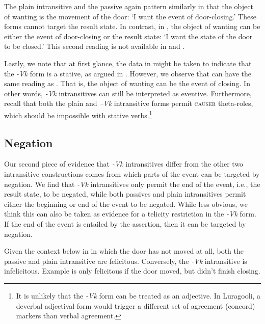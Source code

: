 \documentclass[output=paper]{langsci/langscibook}
\begin{document}
The plain intransitive and the passive again pattern similarly in that the object of wanting is the movement of the door: ‘I want the event of door-closing.’ These forms cannot target the result state. In contrast, in , the object of wanting can be either the event of door-closing or the result state: ‘I want the state of the door to be closed.’ This second reading is not available in  and .

Lastly, we note that at first glance, the data in  might be taken to indicate that the \textit{-Vk} form is a stative, as argued in \citet{Dubinsky1996}. However, we observe that  can have the same reading as . That is, the object of wanting can be the event of closing. In other words, \textit{-Vk} intransitives can still be interpreted as eventive. Furthermore, recall that both the plain and \textit{–Vk} intransitive forms permit \textsc{causer} theta-roles, which should be impossible with stative verbs.\footnote{It is unlikely that the \textit{-Vk} form can be treated as an adjective. In Luragooli, a deverbal adjectival form would trigger a different set of agreement (concord) markers than verbal agreement.}

\subsection{Negation} 

Our second piece of evidence that \textit{-Vk} intransitives differ from the other two intransitive constructions comes from which parts of the event can be targeted by negation. We find that \textit{-Vk} intransitives only permit the end of the event, i.e., the result state, to be negated, while both passives and plain intransitives permit either the beginning or end of the event to be negated. While less obvious, we think this can also be taken as evidence for a telicity restriction in the \textit{-Vk} form. If the end of the event is entailed by the assertion, then it can be targeted by negation. 

Given the context below in  in which the door has not moved at all, both the passive  and plain intransitive  are felicitous. Conversely, the \textit{-Vk} intransitive  is infelicitous. Example  is only felicitous if the door moved, but didn’t finish closing.
\end{document}
